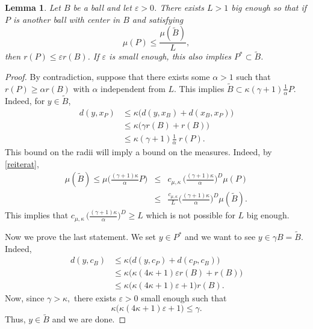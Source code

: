 \documentclass[11pt,a4paper]{amsart}
\newtheorem{lemma}[theorem]{Lemma}
\theoremstyle{definition}
\theoremstyle{remark}
\numberwithin{equation}{section}
\numberwithin{equation}{section}
\begin{document}
\begin{lemma}\label{lem:Bolas}
Let $B$ be a ball and let $\varepsilon>0$. There exists $L>1$ big enough so that if $P$ is another ball with center in $B$ and satisfying
%
\[
\mu(P) \leq \frac{\mu(\tilde B)}{L},
\]
%
then $r(P) \leq \varepsilon r(B)$. If $\varepsilon$ is small enough, this also implies $P^* \subset \tilde B$.
\end{lemma}

%
\begin{proof}
By contradiction, suppose that there exists some $\alpha>1$ such that $r(P) \geq \alpha r(B)$ with $\alpha$ independent from $L$. This implies $\tilde B \subset \kappa (\gamma+1)\frac 1\alpha P$. Indeed, for $y\in \tilde B$,
\begin{align*}
d(y,x_P) & \leq \kappa \big( d(y,x_B)+d(x_B,x_P)\big) \\
%
& \leq \kappa \big( \gamma r(B) + r(B) \big) \\%
& \leq \kappa (\gamma+1)  \frac 1 \alpha \ r(P).
\end{align*}
%
This bound on the radii will imply a bound on the measures. Indeed, by \eqref{reiterat},
%
\begin{eqnarray*}
\mu(\tilde B)  \leq \mu \big( \frac{  (\gamma+1)\kappa}{ \alpha} P\big) & \leq &c_{\mu,\kappa}\, \Big( \frac{  (\gamma+1)\kappa}{ \alpha} \Big)^{D} \mu(P)\\
&  \leq & \frac{c_{\mu,\kappa}}L  \Big( \frac{ (\gamma+1) \kappa }{\alpha} \Big)^{D} \mu(\tilde B ).
\end{eqnarray*}
This implies that $  c_{\mu,\kappa}\,\Big( \frac{ (\gamma+1) \kappa }{\alpha} \Big)^{D} \geq L$ which is not possible for $L$ big enough.

Now we prove the last statement. We set $y \in P^*$ and we want to see $y\in \gamma B=\tilde B$. Indeed,
%
\begin{align*}
d(y,c_B) & \leq \kappa \big( d(y,c_P) + d(c_P,c_B) \big) \\
%
& \leq \kappa \big( \kappa (4\kappa +1) \varepsilon r(B) + r(B) \big) \\
%
& \leq \kappa \big( \kappa (4\kappa+1) \varepsilon +1) r(B).
\end{align*}
Now, since $\gamma > \kappa,$ there exists $\varepsilon>0$ small enough such that 
\[\kappa \big( \kappa (4\kappa+1) \varepsilon +1)\leq \gamma.\]
Thus, $y\in \tilde B$ and we are done.
\end{proof}
\end{document}
